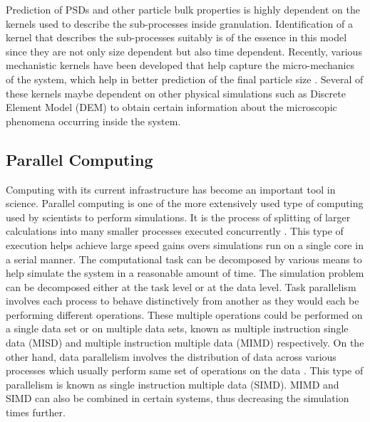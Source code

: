 \documentclass[preprint,10pt,authoryear,review]{elsarticle}
\begin{document}
\begin{linenumbers}
Prediction of PSDs and other particle bulk properties is highly dependent on 
the kernels used to describe the sub-processes inside granulation. Identification 
of a kernel that describes the sub-processes suitably is of the essence in this model 
since they are not only size dependent but also time dependent. Recently, various 
mechanistic kernels have been developed that help capture the micro-mechanics of the 
system, which help in better prediction of the final particle size \citep{Barrasso2015processes}. 
Several of these kernels maybe dependent on other physical simulations such as Discrete 
Element Model (DEM) to obtain certain information about the microscopic phenomena 
occurring inside the system.


\subsection{Parallel Computing}
Computing with its current infrastructure has become an important tool in science. 
Parallel computing is one of the more extensively used type of computing used by scientists 
to perform simulations. It is the process of splitting of larger calculations into 
many smaller processes executed concurrently \citep{Almasi1989}. This type of execution 
helps achieve large speed gains overs simulations run on a single core in a serial manner.
The computational task can be decomposed by various means to help simulate the system 
in a reasonable amount of time. The simulation problem can be decomposed either 
at the task level or at the data level. Task parallelism involves each process to 
behave distinctively from another as they would each be performing different operations. 
These multiple operations could be performed on a single data set or on multiple data 
sets, known as multiple instruction single data (MISD) and multiple instruction 
multiple data (MIMD) respectively. On the other hand, data parallelism 
involves the distribution of data across various processes which usually perform same set of 
operations on the data \citep{solihin2015}. This type of parallelism is known 
as single instruction multiple data (SIMD). MIMD and SIMD can also 
be combined in certain systems, thus decreasing the simulation times further.


\end{linenumbers}
\end{document}
